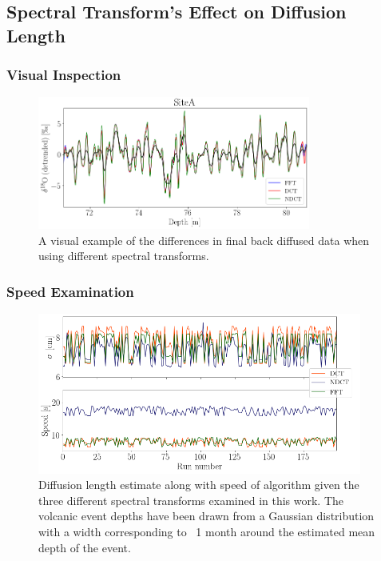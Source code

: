 \documentclass[../../CompleteThesis2/Complete_2ndDraft]{subfiles}
\begin{document}
\subsection[Spectral Transforms]{Spectral Transform's Effect on Diffusion Length}
\label{Subsec:Method_TestStab_SpecTrans}

\subsubsection{Visual Inspection}
\label{Subsubsec:Method_TestStab_SpecTrans_VisInspection}

\begin{figure}[h]
	\centering
	\includegraphics[width=0.8\textwidth]{SiteA_SpecTrans_VisInspection.png}
	\caption[Qualitative Example of Spectral Transform's Effect on $\sigma$]{\small A visual example of the differences in final back diffused data when using different spectral transforms. }
	\label{fig:SiteA_SpecTrans_VisInspection}
\end{figure}


\subsubsection{Speed Examination}
\label{Subsubsec:Method_TestStab_SpecTrans_Speed}

\begin{figure}[h]
	\centering
	\includegraphics[width=0.95\textwidth]{SiteA_SpecTrans_Speed.png}
	\caption[Speed and $\sigma$ Estimates, Spectral Transforms]{\small Diffusion length estimate along with speed of algorithm given the three different spectral transforms examined in this work. The volcanic event depths have been drawn from a Gaussian distribution with a width corresponding to ~1 month around the estimated mean depth of the event.}
	\label{fig:SiteA_SpecTrans_Speed}
\end{figure}
\end{document}
